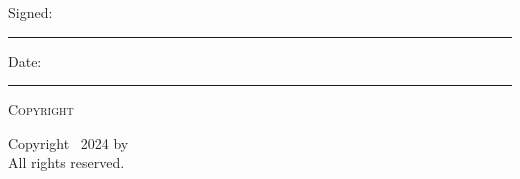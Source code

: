 \documentclass[12pt,a4paper,oneside]{book}
\begin{document}
\vspace{15mm}

\noindent Signed:\hspace{5mm}\rule{0.35\textwidth}{0.4pt}

\vspace{5mm}

\noindent Date:\hspace{5mm}\rule{0.35\textwidth}{0.4pt}

\vspace{30mm}

\begin{center}
{\large\scshape\color{tsinghuapurple}Copyright}

\vspace{10mm}

Copyright \textcopyright\ 2024 by \tsinghuaauthor\\
All rights reserved.
\end{center}

\newpage

















\end{document}
